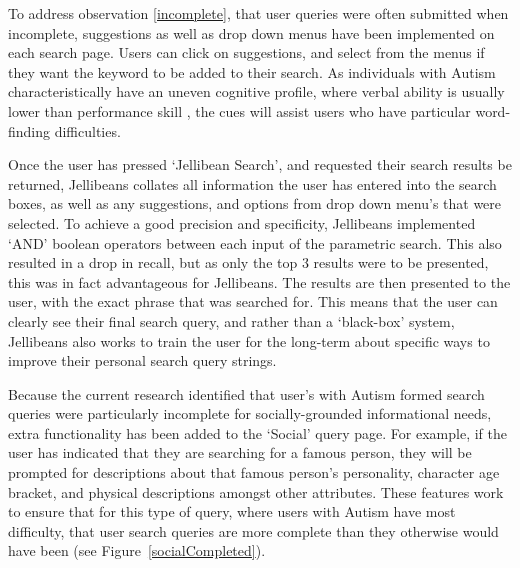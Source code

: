 \documentclass[a4paper, 11pt]{article}
\begin{document}
\vspace{5mm} %
To address observation \ref{incomplete}, that user queries were often submitted when incomplete, suggestions as well as drop down menus have been implemented on each search page. Users can click on suggestions, and select from the menus if they want the keyword to be added to their search. As individuals with Autism characteristically have an uneven cognitive profile, where verbal ability is usually lower than performance skill \cite{DSM}, the cues will assist users who have particular word-finding difficulties.


\vspace{5mm}
Once the user has pressed `Jellibean Search', and requested their search results be returned, Jellibeans collates all information the user has entered into the search boxes, as well as any suggestions, and options from drop down menu's that were selected. To achieve a good precision and specificity, Jellibeans implemented `AND' boolean operators between each input of the parametric search. This also resulted in a drop in recall, but as only the top 3 results were to be presented, this was in fact advantageous for Jellibeans. The results are then presented to the user, with the exact phrase that was searched for. This means that the user can clearly see their final search query, and rather than a `black-box' system, Jellibeans also works to train the user for the long-term about specific ways to improve their personal search query strings. 

 \vspace{5mm}
 Because the current research identified that user's with Autism formed search queries were particularly incomplete for socially-grounded informational needs, extra functionality has been added to the `Social' query page. For example, if the user has indicated that they are searching for a famous person, they will be prompted for descriptions about that famous person's personality, character age bracket, and physical descriptions amongst other attributes. These features work to ensure that for this type of query, where users with Autism have most difficulty, that user search queries are more complete than they otherwise would have been (see Figure~\ref{socialCompleted}).
\end{document}
